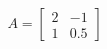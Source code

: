 \documentclass[preview]{standalone}
\begin{document}
\begin{align*}
A=\begin{bmatrix}2 & -1\\ 1 & 0.5\end{bmatrix}
\end{align*}
\end{document}

